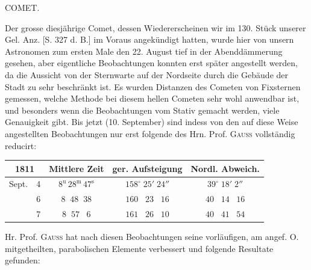 \par{}\bigskip
\hypertarget{native-342-lower}{}\label{native-342-lower}
\begin{center}
\large COMET.
\end{center}

\par\indent Der grosse diesjährige Comet, dessen Wiedererscheinen wir im 130. Stück unserer Gel. Anz. [S. 327 d. B.] im Voraus angekündigt hatten, wurde hier von unsern Astronomen zum ersten Male den 22. August tief in der Abenddämmerung gesehen, aber eigentliche Beobachtungen konnten erst später angestellt werden, da die Aussicht von der Sternwarte auf der Nordseite durch die Gebäude der Stadt zu sehr beschränkt ist. Es wurden Distanzen des Cometen von Fixsternen gemessen, welche Methode bei diesem hellen Cometen sehr wohl anwendbar ist, und besonders wenn die Beobachtungen vom Stativ gemacht werden, viele Genauigkeit gibt. Bis jetzt (10. September) sind indess von den auf diese Weise angestellten Beobachtungen nur erst folgende des Hrn. Prof. \textsc{Gauss} vollständig reducirt:

\begin{center}\fontsize{10}{12}\selectfont\setlength{\tabcolsep}{4pt}\renewcommand{\arraystretch}{1.15}\begin{tabular}{ll|c|c|c}
\multicolumn{2}{c|}{1811} & Mittlere Zeit & ger. Aufsteigung & Nordl. Abweich. \\\hline
Sept. & 4 & $8^{\mathrm u}\,28^{\mathrm m}\,47^{\mathrm s}$ & $158^\circ\;25'\;24''$ & $39^\circ\;18'\;2''$ \\
 & 6 & $8\;\;48\;\;38$ & $160\;\;\;23\;\;\;16$ & $40\;\;\;14\;\;\;16$ \\
 & 7 & $8\;\;57\;\;\;6$ & $161\;\;\;26\;\;\;10$ & $40\;\;\;41\;\;\;54$ \\
\end{tabular}
\end{center}

\par\indent Hr. Prof. \textsc{Gauss} hat nach diesen Beobachtungen seine vorläufigen, am angef. O. mitgetheilten, parabolischen Elemente verbessert und folgende Resultate gefunden:

